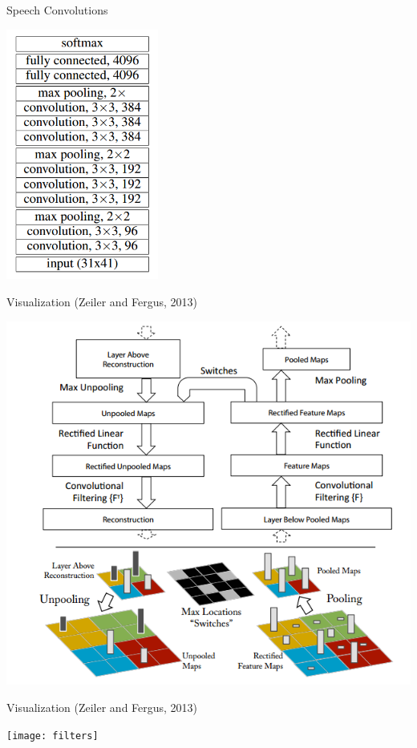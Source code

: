 \documentclass{beamer}
\begin{document}
\begin{frame}{Speech Convolutions}
  \begin{center}
    \includegraphics[width=5cm]{speechconv}
  \end{center}
  
\end{frame}

\begin{frame}{Visualization (Zeiler and Fergus, 2013)}
  \begin{center}
    \includegraphics[height=\textheight]{zf}
  \end{center}
\end{frame}

\begin{frame}{Visualization (Zeiler and Fergus, 2013)}
  \begin{center}
    \texttt{[image: filters]}
  \end{center}
  
\end{frame}
\end{document}
